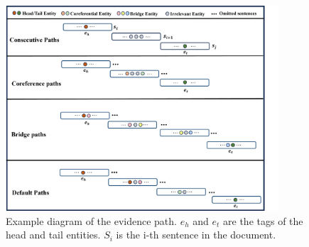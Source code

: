 \documentclass[preprint,12pt]{elsarticle}
\begin{document}
\begin{figure}[htbp]
\centering
\includegraphics[width=4in]{./path.png}
\caption{ Example diagram of the evidence path. $e_h$ and $e_t$ are the tags of the head and tail entities. $S_i$ is the i-th sentence in the document.}
\label{fig.4}
\end{figure}
\end{document}
